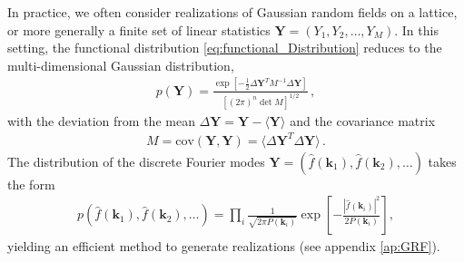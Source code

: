 \documentclass[a4paper, 11pt]{article}
\begin{document}


In practice, we often consider realizations of Gaussian random fields on a lattice, or more generally a finite set of linear statistics $\bm{Y}=(Y_1,Y_2,\dots,Y_M)$. In this setting, the functional distribution \eqref{eq:functional_Distribution} reduces to the multi-dimensional Gaussian distribution,
\begin{align}
p(\bm{Y}) = \frac{\exp\left[-\frac{1}{2}  \Delta \bm{Y}^T M^{-1} \Delta \bm{Y}\right]}{[(2\pi)^n \det M]^{1/2}}\,,
\end{align}
with the deviation from the mean $\Delta \bm{Y} = \bm{Y} - \langle \bm{Y}\rangle$ and the covariance matrix
\begin{align}
M = \text{cov}(\bm{Y},\bm{Y}) = \langle \Delta \bm{Y}^T \Delta \bm{Y}\rangle\,.
\end{align}
The distribution of the discrete Fourier modes $\bm{Y}=(\hat{f}(\bm{k}_1),\hat{f}(\bm{k}_2),\dots)$ takes the form 
\begin{align}
p\left(\hat{f}(\bm{k}_1), \hat{f}(\bm{k}_2), \dots\right) = \prod_{i} \frac{1}{\sqrt{2\pi P( \bm{k}_i)}} \exp\left[-\frac{|\hat{f}(\bm{k}_i)|^2}{2P(\bm{k}_i)}\right],
\end{align}
yielding an efficient method to generate realizations (see appendix \ref{ap:GRF}).
\end{document}
